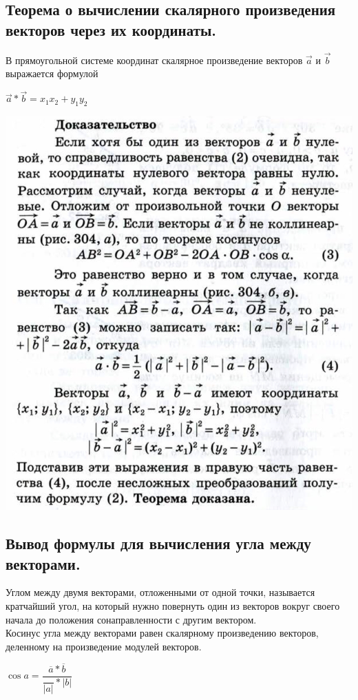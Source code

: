 \documentclass[12pt, letterpaper]{article}
\begin{document}
\subsection {Теорема о вычислении скалярного произведения векторов через их координаты.}
В прямоугольной системе координат скалярное произведение векторов $\vec{a}$ и $\vec{b}$ выражается формулой \\
\begin{center}
$\vec{a}*\vec{b}={x_1}{x_2}+{y_1}{y_2}$
\end{center}
\includegraphics[scale=0.3]{photo2.jpg} \\
\subsection {Вывод формулы для вычисления угла между векторами.}
Углом между двумя векторами, отложенными от одной точки, называется кратчайший угол, на который нужно повернуть один из векторов вокруг своего начала до положения сонаправленности с другим вектором. \\
Косинус угла между векторами равен скалярному произведению векторов, деленному на произведение модулей векторов. \\
\begin{center}
$ \cos a =\dfrac{\overline{a}*\overline{b}}{\dfrac{}{\left|a\right|}*{\left|b\right|}} $ \\
\end{center}
\end{document}
